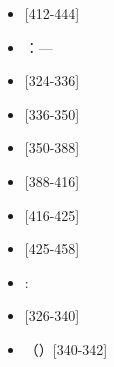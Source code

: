 \begin{itemize}
\item {} [412-444]
\end{itemize}

\begin{itemize}
\item {}：—
\end{itemize}

\begin{itemize}
\item {} [324-336]
\end{itemize}

\begin{itemize}
\item {} [336-350]
\end{itemize}

\begin{itemize}
\item {} [350-388]
\end{itemize}

\begin{itemize}
\item {} [388-416]
\end{itemize}

\begin{itemize}
\item {} [416-425]
\end{itemize}

\begin{itemize}
\item {} [425-458]
\end{itemize}

\begin{itemize}
\item {}:
\end{itemize}

\begin{itemize}
\item {} [326-340]
\end{itemize}

\begin{itemize}
\item {}（）[340-342]
\end{itemize}


